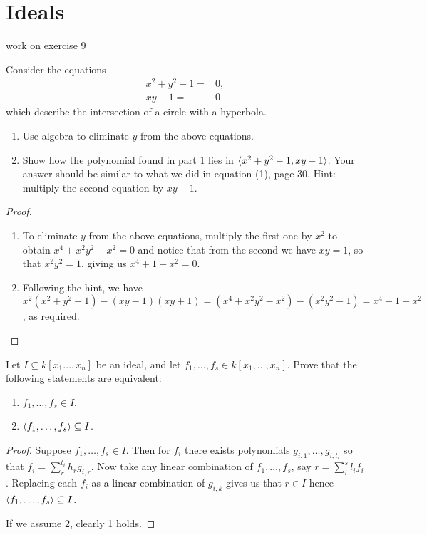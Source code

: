 \section{Ideals}

work on exercise 9

\begin{exercise}{1}
Consider the equations
\begin{align*}
    x^2+y^2-1 =& 0,\\
    xy-1 =& 0
\end{align*}
which describe the intersection of a circle with a hyperbola.
\begin{enumerate}
    \item Use algebra to eliminate $y$ from the above equations.
    \item Show how the polynomial found in part 1 lies in $\langle x^2+y^2-1, xy-1\rangle$. 
    Your answer should be similar to what we did in equation (1), page 30. 
    Hint: multiply the second equation by $xy-1$.
\end{enumerate}
\end{exercise}
\begin{proof}
\begin{enumerate}
    \item To eliminate $y$ from the above equations, multiply the first one by $x^2$ to obtain $x^4+x^2y^2-x^2=0$ and notice that from the second we have $xy=1$, so that $x^2y^2=1$, giving us $x^4+1-x^2=0$.
    \item Following the hint, we have 
    $x^2(x^2+y^2-1)-(xy-1)(xy+1) 
    =(x^4+x^2y^2-x^2)-(x^2y^2-1) 
    =x^4+1-x^2$, as required.
\end{enumerate}
\end{proof}

\begin{exercise}{2}
Let $I\subseteq k[x_1\dots,x_n]$ be an ideal, and let $f_1,\dots,f_s\in k[x_1,\dots,x_n]$. 
Prove that the following statements are equivalent:
\begin{enumerate}
    \item $f_1,\dots,f_s\in I$.
    \item $\langle f_1,\dots,f_s\rangle\subseteq I$.
\end{enumerate}
\end{exercise}
\begin{proof}
Suppose $f_1,\dots,f_s\in I$. 
Then for $f_i$ there exists polynomials $g_{i,1},\dots,g_{i,t_i}$ so that $f_i=\sum_r^{t_i}h_rg_{i,r}$. 
Now take any linear combination of $f_1,\dots,f_s$, say $r=\sum_i^sl_if_i$. 
Replacing each $f_i$ as a linear combination of $g_{i,k}$ gives us that $r\in I$ hence $\langle f_1,\dots,f_s\rangle\subseteq I$. 

If we assume 2, clearly 1 holds.
\end{proof}

